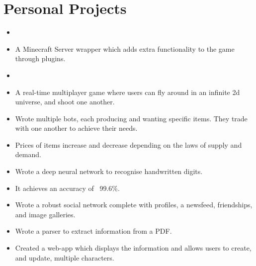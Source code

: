 \documentclass{jcgcv}
\begin{document}
\begin{column}



\section{Personal Projects}

\begin{itemize}
  \item {}
  \item A Minecraft Server wrapper which adds extra functionality to the game through plugins.
\end{itemize}

\begin{itemize}
  \item {}
  \item A real-time multiplayer game where users can fly around in an infinite 2d universe, and shoot one another.
\end{itemize}

\begin{itemize}
  \item Wrote multiple bots, each producing and wanting specific items. They trade with one another to achieve their needs.
  \item Prices of items increase and decrease depending on the laws of supply and demand.
\end{itemize}

\begin{itemize}
  \item Wrote a deep neural network to recognise handwritten digits.
  \item It achieves an accuracy of ~99.6\%.
\end{itemize}

\begin{itemize}
  \item Wrote a robust social network complete with profiles, a newsfeed, friendships, and image galleries.
\end{itemize}

\begin{itemize}
  \item Wrote a parser to extract information from a PDF.
  \item Created a web-app which displays the information and allows users to create, and update, multiple characters.
\end{itemize}


\end{column}
\end{document}
